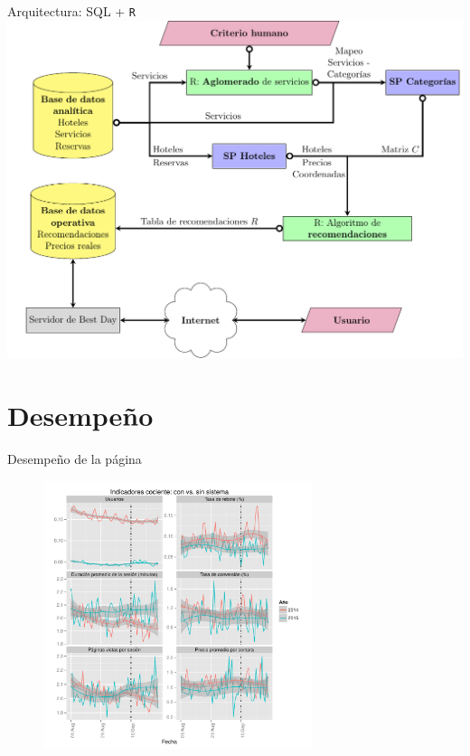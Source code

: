 \documentclass{beamer}
\begin{document}
\begin{frame}{Arquitectura: SQL + \texttt{R}}
	\includegraphics[width=\textwidth]{imagenes/flowchart.pdf}
\end{frame}

\section{Desempeño}

\begin{frame}{Desempeño de la página}
	\begin{figure}
		\centering
		\includegraphics[width=0.7\textwidth]{imagenes/analytics_anios_y.pdf}
	\end{figure}
\end{frame}
\end{document}
